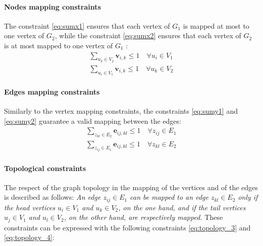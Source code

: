 \documentclass[times,onecolumn,final,authoryear]{article}
\theoremstyle{definition}
\begin{document}
\paragraph{Nodes mapping constraints}
The constraint \eqref{eq:sumx1} ensures that each vertex of $G_{1}$ is mapped at most to one vertex of $G_{2}$, while the constraint \eqref{eq:sumx2} ensures that each vertex of $G_{2}$ is at most mapped to one vertex of $G_{1}$ :
\begin{subequations}
  \begin{align}
  \sum_{u_k \in V_2} \textbf{v}_{i,k}  \leq 1 \quad \forall u_i \in V_1 \label{eq:sumx1}\\
  \sum_{u_i \in V_1} \textbf{v}_{i,k}  \leq 1 \quad \forall u_k \in V_2 \label{eq:sumx2}
  \end{align}
\end{subequations}


\paragraph{Edges mapping constraints}
Similarly to the vertex mapping constraints, the constraints \eqref{eq:sumy1} and \eqref{eq:sumy2} guarantee a valid mapping between the edges:
\begin{subequations}
  \begin{align}
    \sum_{z_{kl} \in E_2} \textbf{e}_{ij,kl}  \leq 1 \quad \forall z_{ij} \in E_1 \label{eq:sumy1}\\
  \sum_{z_{ij} \in E_1} \textbf{e}_{ij,kl}  \leq 1 \quad \forall z_{kl} \in E_2 \label{eq:sumy2}
  \end{align}
\end{subequations}

\paragraph{Topological constraints}
The respect of the graph topology in the mapping of the vertices and of the edges is described as follows:
\textit{An edge $z_{ij} \in E_1$ can be mapped to an edge $z_{kl} \in E_2$ only if the head vertices $u_i \in V_1$ and $u_k \in V_2$, on the one hand, and if the tail vertices $u_j \in V_1$ and $u_l \in V_2$, on the other hand, are respectively mapped.}
These constraints can be expressed with the following constraints \eqref{eq:topology_3} and \eqref{eq:topology_4}:
\end{document}
